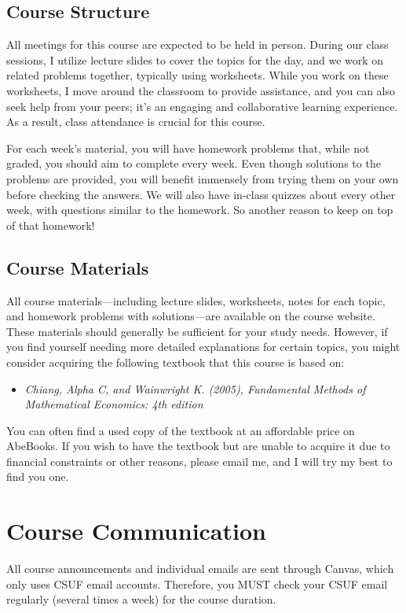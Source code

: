 \documentclass{./../Latex/syllabus}
\begin{document}
\subsection*{Course Structure}

All meetings for this course are expected to be held in person. During our class sessions, I utilize lecture slides to cover the topics for the day, and we work on related problems together, typically using worksheets. While you work on these worksheets, I move around the classroom to provide assistance, and you can also seek help from your peers; it's an engaging and collaborative learning experience. As a result, class attendance is crucial for this course.

For each week's material, you will have homework problems that, while not graded, you should aim to complete every week. Even though solutions to the problems are provided, you will benefit immensely from trying them on your own before checking the answers. We will also have in-class quizzes about every other week, with questions similar to the homework. So another reason to keep on top of that homework!

\subsection*{Course Materials}

All course materials—including lecture slides, worksheets, notes for each topic, and homework problems with solutions—are available on the course website. These materials should generally be sufficient for your study needs. However, if you find yourself needing more detailed explanations for certain topics, you might consider acquiring the following textbook that this course is based on:

\begin{itemize}
  \item \textit{Chiang, Alpha C, and Wainwright K. (2005), Fundamental Methods of Mathematical Economics: 4th edition}
\end{itemize}

You can often find a used copy of the textbook at an affordable price on AbeBooks. If you wish to have the textbook but are unable to acquire it due to financial constraints or other reasons, please email me, and I will try my best to find you one.

\section*{Course Communication}
All course announcements and individual emails are sent through Canvas, which only uses CSUF email accounts. Therefore, you MUST check your CSUF email regularly (several times a week) for the course duration.
\end{document}
